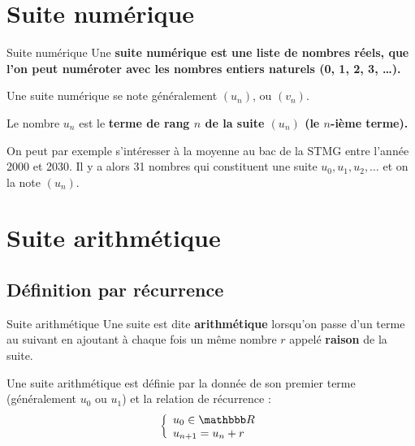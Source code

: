 \documentclass[10pt,a4paper,openany,twoside]{book}
\begin{document}
	\entetegal

	\section{Suite numérique}

	\begin{defi}{Suite numérique}{}
  Une \bf {suite numérique} est une liste de nombres réels, que l'on
  peut numéroter avec les nombres entiers naturels
  (0, 1, 2, 3, \dots).

	Une suite numérique se note généralement $(u_n)$, ou $(v_n)$.

	Le nombre $u_n$ est le \bf{terme} de rang $n$ de la suite $(u_n)$
	(le $n$-ième terme).
	\end{defi}

\begin{ex}{}{}
	On peut par exemple s'intéresser à la moyenne au bac de la STMG entre l'année 2000 et 2030. Il y a alors 31 nombres qui constituent une suite $u_0, u_1, u_2, \ldots$ et on la note $(u_n)$.
\end{ex}


	\section{Suite arithmétique}
\subsection{Définition par récurrence}

\begin{defi}{Suite arithmétique}{}
Une suite est dite \textbf{arithmétique} lorsqu'on passe d'un terme au suivant en ajoutant à chaque fois un même nombre $r$ appelé \textbf{raison} de la suite.

\noindent Une suite arithmétique est définie par la donnée de son premier terme (généralement $u_0$ ou $u_1$) et la relation de récurrence :
\[ \left\lbrace
   \begin{array}{l}
      u_0\in \R\\
      u_{n+1} = u_n + r\\
   \end{array}
\right. \]
\begin{center}
\end{center}
\end{defi}
\end{document}
